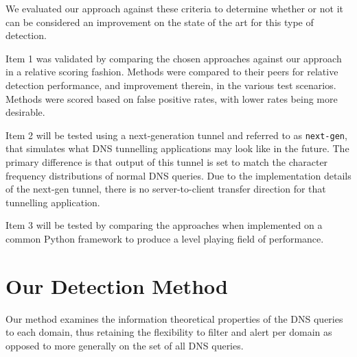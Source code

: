 \documentclass{llncs}
\begin{document}
We evaluated our approach against these criteria to determine whether
or not it can be considered an improvement on the state of the art for
this type of detection.


Item 1 was validated by comparing the chosen approaches against our
approach in a relative scoring fashion. Methods were compared to their
peers for relative detection performance, and improvement therein, in
the various test scenarios. Methods were scored based on false
positive rates, with lower rates being more desirable.

Item 2 will be tested using a next-generation tunnel and referred to
as \texttt{next-gen}, that simulates what DNS tunnelling applications
may look like in the future. The primary difference is that output of
this tunnel is set to match the character frequency distributions of
normal DNS queries. Due to the implementation details of the next-gen
tunnel, there is no server-to-client transfer direction for that
tunnelling application.

Item 3 will be tested by comparing the approaches when implemented on
a common Python framework to produce a level playing field of
performance.

\section{Our Detection Method}
\label{proposed-method}

Our method examines the information theoretical properties of the DNS
queries to each domain, thus retaining the flexibility to filter and
alert per domain as opposed to more generally on the set of all DNS
queries.
\end{document}
